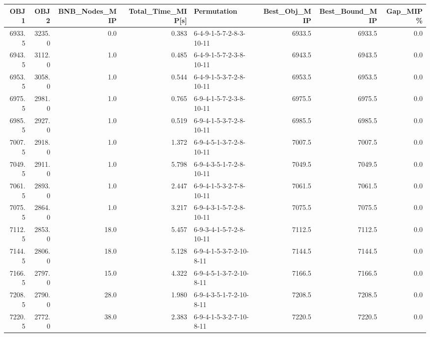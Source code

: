\begin{tabular}{rrrrlrrr}
\toprule
   OBJ1 &    OBJ2 &  BNB\_Nodes\_MIP &  Total\_Time\_MIP[s] &              Permutation &  Best\_Obj\_MIP &  Best\_Bound\_MIP &  Gap\_MIP\% \\
\midrule
 6933.5 &  3235.0 &            0.0 &              0.383 &  6-4-9-1-5-7-2-8-3-10-11 &        6933.5 &          6933.5 &       0.0 \\
 6943.5 &  3112.0 &            1.0 &              0.485 &  6-4-9-1-5-7-2-3-8-10-11 &        6943.5 &          6943.5 &       0.0 \\
 6953.5 &  3058.0 &            1.0 &              0.544 &  6-4-9-1-5-3-7-2-8-10-11 &        6953.5 &          6953.5 &       0.0 \\
 6975.5 &  2981.0 &            1.0 &              0.765 &  6-9-4-1-5-7-2-3-8-10-11 &        6975.5 &          6975.5 &       0.0 \\
 6985.5 &  2927.0 &            1.0 &              0.519 &  6-9-4-1-5-3-7-2-8-10-11 &        6985.5 &          6985.5 &       0.0 \\
 7007.5 &  2918.0 &            1.0 &              1.372 &  6-9-4-5-1-3-7-2-8-10-11 &        7007.5 &          7007.5 &       0.0 \\
 7049.5 &  2911.0 &            1.0 &              5.798 &  6-9-4-3-5-1-7-2-8-10-11 &        7049.5 &          7049.5 &       0.0 \\
 7061.5 &  2893.0 &            1.0 &              2.447 &  6-9-4-1-5-3-2-7-8-10-11 &        7061.5 &          7061.5 &       0.0 \\
 7075.5 &  2864.0 &            1.0 &              3.217 &  6-9-4-3-1-5-7-2-8-10-11 &        7075.5 &          7075.5 &       0.0 \\
 7112.5 &  2853.0 &           18.0 &              5.457 &  6-9-3-4-1-5-7-2-8-10-11 &        7112.5 &          7112.5 &       0.0 \\
 7144.5 &  2806.0 &           18.0 &              5.128 &  6-9-4-1-5-3-7-2-10-8-11 &        7144.5 &          7144.5 &       0.0 \\
 7166.5 &  2797.0 &           15.0 &              4.322 &  6-9-4-5-1-3-7-2-10-8-11 &        7166.5 &          7166.5 &       0.0 \\
 7208.5 &  2790.0 &           28.0 &              1.980 &  6-9-4-3-5-1-7-2-10-8-11 &        7208.5 &          7208.5 &       0.0 \\
 7220.5 &  2772.0 &           38.0 &              2.383 &  6-9-4-1-5-3-2-7-10-8-11 &        7220.5 &          7220.5 &       0.0 \\

\end{tabular}
